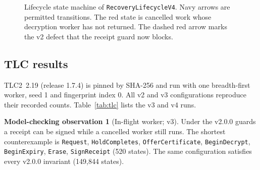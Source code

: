 \documentclass[pdflatex,sn-mathphys-num,twocolumn]{sn-jnl}
\theoremstyle{plain}
\theoremstyle{definition}
\newtheorem{observation}{Model-checking observation}
\newcommand{\code}[1]{\texttt{#1}}
\begin{document}
\begin{figure}[t]
\centering
\resizebox{\linewidth}{!}{}
\caption{Lifecycle state machine of \code{RecoveryLifecycleV4}. Navy arrows are permitted transitions. The red state is cancelled work whose decryption worker has not returned. The dashed red arrow marks the v2 defect that the receipt guard now blocks.}\label{fig:lifecycle}
\end{figure}

\subsection{TLC results}
TLC2~2.19 (release 1.7.4) is pinned by SHA-256 and run with one breadth-first worker, seed 1 and fingerprint index 0. All v2 and v3 configurations reproduce their recorded counts. Table~\ref{tab:tlc} lists the v3 and v4 runs.

\begin{observation}[In-flight worker; v3]\label{obs:inflight}
Under the v2.0.0 guards a receipt can be signed while a cancelled worker still runs. The shortest counterexample is \code{Request}, \code{HoldCompletes}, \code{OfferCertificate}, \code{BeginDecrypt}, \code{BeginExpiry}, \code{Erase}, \code{SignReceipt} (520 states). The same configuration satisfies every v2.0.0 invariant (149,844 states).
\end{observation}
\end{document}
